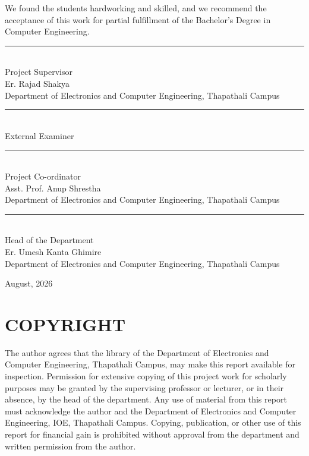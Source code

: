 \documentclass[12pt,a4paper,openany]{report}
\begin{document}
We found the students hardworking and skilled, and we recommend the acceptance of this work for partial fulfillment of the Bachelor's Degree in Computer Engineering.

\vspace{2em}
\noindent\rule{5cm}{0.4pt}\\
Project Supervisor\\
Er. Rajad Shakya\\
Department of Electronics and Computer Engineering, Thapathali Campus

\vspace{1em}
\noindent\rule{5cm}{0.4pt}\\
External Examiner\\

\vspace{1em}
\noindent\rule{5cm}{0.4pt}\\
Project Co-ordinator\\
Asst. Prof. Anup Shrestha\\
Department of Electronics and Computer Engineering, Thapathali Campus

\vspace{1em}
\noindent\rule{5cm}{0.4pt}\\
Head of the Department\\
Er. Umesh Kanta Ghimire\\
Department of Electronics and Computer Engineering, Thapathali Campus

\vspace{1em}
\noindent August, 2026

\clearpage

\chapter*{COPYRIGHT}

The author agrees that the library of the Department of Electronics and Computer Engineering, Thapathali Campus, may make this report available for inspection. Permission for extensive copying of this project work for scholarly purposes may be granted by the supervising professor or lecturer, or in their absence, by the head of the department. Any use of material from this report must acknowledge the author and the Department of Electronics and Computer Engineering, IOE, Thapathali Campus. Copying, publication, or other use of this report for financial gain is prohibited without approval from the department and written permission from the author.
\end{document}
